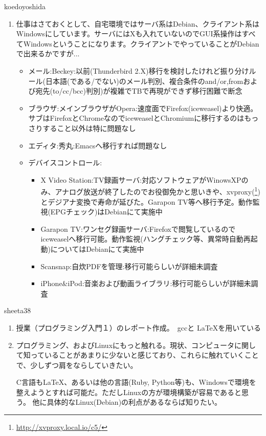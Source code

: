 \begin{prework}{ koedoyoshida }

\begin{enumerate}
\item 仕事はさておくとして、自宅環境ではサーバ系はDebian、クライアント系はWindowsにしています。サーバにはXも入れていないのでGUI系操作はすべてWindowsということになります。クライアントでやっていることがDebianで出来るかですが...
  \begin{itemize}
  \item メール:Beckey:以前(Thunderbird 2.X)移行を検討したけれど振り分けルール(日本語(である/でない)のメール判別、複合条件のand/or,fromおよび宛先(to/cc/bcc)判別)が複雑でTBで再現ができず移行困難で断念
  \item ブラウザ:メインブラウザがOpera:速度面でFirefox(iceweasel)より快適。サブはFirefoxとChromeなのでiceweaselとChromiumに移行するのはもっさりすること以外は特に問題なし
  \item エディタ:秀丸:Emacsへ移行すれば問題なし
  \item デバイスコントロール:
    \begin{itemize}
    \item X Video Station:TV録画サーバ:対応ソフトウェアがWinowsXPのみ、アナログ放送が終了したのでお役御免かと思いきや、xvproxy(\footnote{\url{http://xvproxy.local.io/c5/}})とデジアナ変換で寿命が延びた。Garapon TV等へ移行予定。動作監視(EPGチェック)はDebianにて実施中
    \item Garapon TV:ワンセグ録画サーバ:Firefoxで閲覧しているのでiceweaselへ移行可能。動作監視(ハングチェック等、異常時自動再起動)についてはDebianにて実施中
    \item Scansnap:自炊PDFを管理:移行可能らしいが詳細未調査
    \item iPhone\&iPod:音楽および動画ライブラリ:移行可能らしいが詳細未調査
    \end{itemize}
  \end{itemize}
\end{enumerate}
\end{prework}

\begin{prework}{ sheeta38 }

\begin{enumerate}
\item 授業（プログラミング入門１）のレポート作成。　gccと \LaTeX を用いている
\item プログラミング、およびLinuxにもっと触れる。現状、コンピュータに関して知っていることがあまりに少ないと感じており、これらに触れていくことで、少しずつ肩をならしていきたい。

C言語も\LaTeX、あるいは他の言語(Ruby, Python等)も、Windowsで環境を整えようとすれば可能だ。ただしLinuxの方が環境構築が容易であると思う。
他に具体的なLinux(Debian)の利点があるならば知りたい。
\end{enumerate}

\end{prework}

